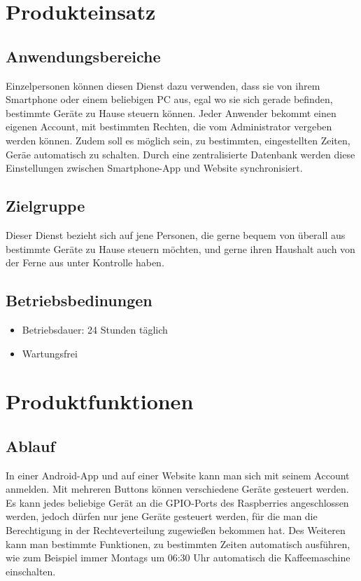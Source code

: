 \documentclass[10pt,a4paper]{report}
\begin{document}
\section{Produkteinsatz}
\subsection{Anwendungsbereiche}
Einzelpersonen können diesen Dienst dazu verwenden, dass sie von ihrem Smartphone oder einem beliebigen PC aus, egal wo sie sich gerade befinden, bestimmte Geräte zu Hause steuern können. Jeder Anwender bekommt einen eigenen Account, mit bestimmten Rechten, die vom Administrator vergeben werden können.
Zudem soll es möglich sein, zu bestimmten, eingestellten Zeiten, Geräe automatisch zu schalten. Durch eine zentralisierte Datenbank werden diese Einstellungen zwischen Smartphone-App und Website synchronisiert.

\subsection{Zielgruppe}
Dieser Dienst bezieht sich auf jene Personen, die gerne bequem von überall aus bestimmte Geräte zu Hause steuern möchten, und gerne ihren Haushalt auch von der Ferne aus unter Kontrolle haben.


\subsection{Betriebsbedinungen}
\begin{itemize}
\item Betriebsdauer: 24 Stunden täglich
\item Wartungsfrei
\end{itemize}

\section{Produktfunktionen}
\subsection{Ablauf}
In einer Android-App und auf einer Website kann man sich mit seinem Account anmelden. Mit mehreren Buttons können verschiedene Geräte gesteuert werden. Es kann jedes beliebige Gerät an die GPIO-Ports des Raspberries angeschlossen werden, jedoch dürfen nur jene Geräte gesteuert werden, für die man die Berechtigung in der Rechteverteilung zugewießen bekommen hat. Des Weiteren kann man bestimmte Funktionen, zu bestimmten Zeiten automatisch ausführen, wie zum Beispiel immer Montags um 06:30 Uhr automatisch die Kaffeemaschine einschalten.
\end{document}
